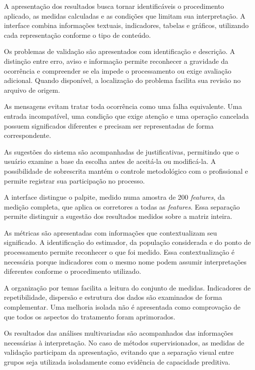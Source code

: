 A apresentação dos resultados busca tornar identificáveis o procedimento aplicado, as medidas calculadas e as condições que limitam sua interpretação. A interface combina informações textuais, indicadores, tabelas e gráficos, utilizando cada representação conforme o tipo de conteúdo.

Os problemas de validação são apresentados com identificação e descrição. A distinção entre erro, aviso e informação permite reconhecer a gravidade da ocorrência e compreender se ela impede o processamento ou exige avaliação adicional. Quando disponível, a localização do problema facilita sua revisão no arquivo de origem.

As mensagens evitam tratar toda ocorrência como uma falha equivalente. Uma entrada incompatível, uma condição que exige atenção e uma operação cancelada possuem significados diferentes e precisam ser representadas de forma correspondente.

As sugestões do sistema são acompanhadas de justificativas, permitindo que o usuário examine a base da escolha antes de aceitá-la ou modificá-la. A possibilidade de sobrescrita mantém o controle metodológico com o profissional e permite registrar sua participação no processo.

A interface distingue o palpite, medido numa amostra de 200 \textit{features}, da medição completa, que aplica os corretores a todas as \textit{features}. Essa separação permite distinguir a sugestão dos resultados medidos sobre a matriz inteira.

As métricas são apresentadas com informações que contextualizam seu significado. A identificação do estimador, da população considerada e do ponto de processamento permite reconhecer o que foi medido. Essa contextualização é necessária porque indicadores com o mesmo nome podem assumir interpretações diferentes conforme o procedimento utilizado.

A organização por temas facilita a leitura do conjunto de medidas. Indicadores de repetibilidade, dispersão e estrutura dos dados são examinados de forma complementar. Uma melhoria isolada não é apresentada como comprovação de que todos os aspectos do tratamento foram aprimorados.

Os resultados das análises multivariadas são acompanhados das informações necessárias à interpretação. No caso de métodos supervisionados, as medidas de validação participam da apresentação, evitando que a separação visual entre grupos seja utilizada isoladamente como evidência de capacidade preditiva.

